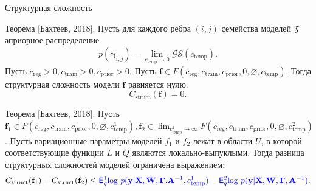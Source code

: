 \documentclass[usenames,dvipsnames,11pt,pdf,utf8,russian,aspectratio=169]{beamer}
\begin{document}
\begin{frame}{Структурная сложность}
\small

\begin{block}{Теорема  [Бахтеев, 2018].}
Пусть для каждого ребра $(i,j)$ семейства моделей $\mathfrak{F}$ априорное распределение $$p(\boldsymbol{\gamma}_{i,j}) =  \lim_{c_{\text{temp}} \to 0} \mathcal{GS}(c_{\text{temp}}).$$
Пусть $c_{\text{reg}} >0, c_{\text{train}} >0, c_{\text{prior}}>0$.
Пусть $\mathbf{f} \in F(c_{\text{reg}}, c_{\text{train}}, c_{\text{prior}}, 0, \varnothing, c_{\text{temp}})$.
Тогда структурная сложность модели $\mathbf{f}$ равняется нулю.
\[
    C_\text{struct}(\mathbf{f}) = 0.
\]
\end{block}

\begin{block}{Теорема [Бахтеев, 2018].}
Пусть $\mathbf{f}_1 \in F(c_{\text{reg}}, c_{\text{train}},  c_{\text{prior}}, 0, \varnothing,  c^1_{\text{temp}}), \mathbf{f}_2   \in \lim_{c^2_{\text{temp}} \to \infty} F(c_{\text{reg}}, c_{\text{train}},  c_{\text{prior}}, 0, \varnothing,  c^2_{\text{temp}})$.
Пусть вариационные параметры моделей $f_1$ и $f_2$ лежат в области $U$, в которой соответствующие функции $L$ и $Q$ являются локально-выпуклыми. 
Тогда разница структурных сложностей моделей ограничена выражением:
\[
    C_\text{struct}(\mathbf{f}_1)  - C_\text{struct}(\mathbf{f}_2) \leq \textcolor{blue}{\mathsf{E}_q^1 \text{log}~{p(\mathbf{y} | \mathbf{X}, \mathbf{W}, \boldsymbol{\Gamma}. \mathbf{A}^{-1}, c^1_{\text{temp}})}} - \textcolor{blue}{\mathsf{E}_q^2 \text{log}~{p(\mathbf{y} | \mathbf{X}, \mathbf{W}, \boldsymbol{\Gamma}, \mathbf{A}^{-1})}}.
\]
\end{block}

\end{frame}
\end{document}

